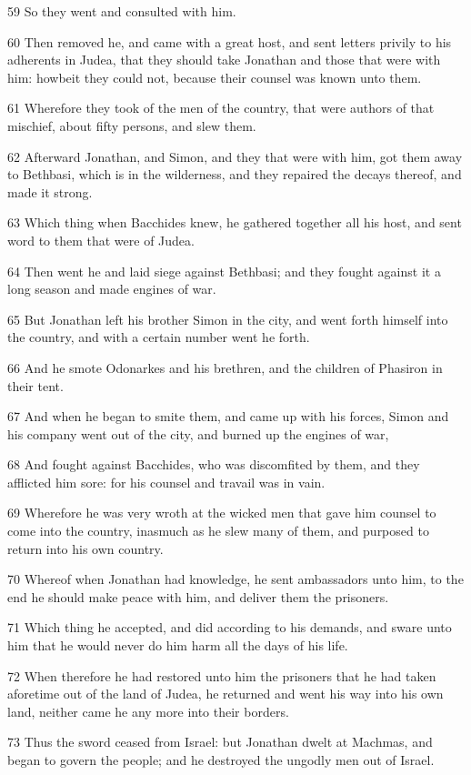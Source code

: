\par 59 So they went and consulted with him.
\par 60 Then removed he, and came with a great host, and sent letters privily to his adherents in Judea, that they should take Jonathan and those that were with him: howbeit they could not, because their counsel was known unto them.
\par 61 Wherefore they took of the men of the country, that were authors of that mischief, about fifty persons, and slew them.
\par 62 Afterward Jonathan, and Simon, and they that were with him, got them away to Bethbasi, which is in the wilderness, and they repaired the decays thereof, and made it strong.
\par 63 Which thing when Bacchides knew, he gathered together all his host, and sent word to them that were of Judea.
\par 64 Then went he and laid siege against Bethbasi; and they fought against it a long season and made engines of war.
\par 65 But Jonathan left his brother Simon in the city, and went forth himself into the country, and with a certain number went he forth.
\par 66 And he smote Odonarkes and his brethren, and the children of Phasiron in their tent.
\par 67 And when he began to smite them, and came up with his forces, Simon and his company went out of the city, and burned up the engines of war,
\par 68 And fought against Bacchides, who was discomfited by them, and they afflicted him sore: for his counsel and travail was in vain.
\par 69 Wherefore he was very wroth at the wicked men that gave him counsel to come into the country, inasmuch as he slew many of them, and purposed to return into his own country.
\par 70 Whereof when Jonathan had knowledge, he sent ambassadors unto him, to the end he should make peace with him, and deliver them the prisoners.
\par 71 Which thing he accepted, and did according to his demands, and sware unto him that he would never do him harm all the days of his life.
\par 72 When therefore he had restored unto him the prisoners that he had taken aforetime out of the land of Judea, he returned and went his way into his own land, neither came he any more into their borders.
\par 73 Thus the sword ceased from Israel: but Jonathan dwelt at Machmas, and began to govern the people; and he destroyed the ungodly men out of Israel.


